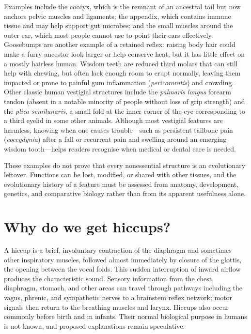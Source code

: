 \documentclass[11pt,oneside]{report}
\begin{document}
Examples include the coccyx, which is the remnant of an ancestral tail but now
anchors pelvic muscles and ligaments; the appendix, which contains immune
tissue and may help support gut microbes; and the small muscles around the
outer ear, which most people cannot use to point their ears effectively.
Goosebumps are another example of a retained reflex: raising body hair could
make a furry ancestor look larger or help conserve heat, but it has little
effect on a mostly hairless human. Wisdom teeth are reduced third molars that
can still help with chewing, but often lack enough room to erupt normally,
leaving them impacted or prone to painful gum inflammation
(\emph{pericoronitis}) and crowding. Other classic human vestigial structures
include the \emph{palmaris longus} forearm tendon (absent in a notable minority
of people without loss of grip strength) and the \emph{plica semilunaris}, a
small fold at the inner corner of the eye corresponding to a third eyelid in
some other animals. Although most vestigial features are harmless, knowing when
one causes trouble—such as persistent tailbone pain (\emph{coccydynia}) after a
fall or recurrent pain and swelling around an emerging wisdom tooth—helps
readers recognise when medical or dental care is needed.

These examples do not prove that every nonessential structure is an evolutionary
leftover. Functions can be lost, modified, or shared with other tissues, and
the evolutionary history of a feature must be assessed from anatomy,
development, genetics, and comparative biology rather than from its apparent
usefulness alone.

\section{Why do we get hiccups?}

A hiccup is a brief, involuntary contraction of the diaphragm and sometimes
other inspiratory muscles, followed almost immediately by closure of the
glottis, the opening between the vocal folds. This sudden interruption of
inward airflow produces the characteristic sound. Sensory information from the
chest, diaphragm, stomach, and other areas can travel through pathways including
the vagus, phrenic, and sympathetic nerves to a brainstem reflex network; motor
signals then return to the breathing muscles and larynx. Hiccups also occur
commonly before birth and in infants. Their normal biological purpose in humans
is not known, and proposed explanations remain speculative.
\end{document}
